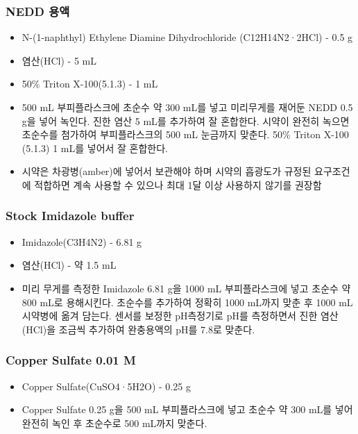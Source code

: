 \documentclass[
]{book}
\providecommand{\tightlist}{%
  \setlength{\itemsep}{0pt}\setlength{\parskip}{0pt}}
\begin{document}
\hypertarget{nedd-uxc6a9uxc561}{%
\subsubsection{NEDD 용액}\label{nedd-uxc6a9uxc561}}

\begin{itemize}
\tightlist
\item
  N-(1-naphthyl) Ethylene Diamine Dihydrochloride (C12H14N2·2HCl) - 0.5 g
\item
  염산(HCl) - 5 mL
\item
  50\% Triton X-100(5.1.3) - 1 mL
\item
  500 mL 부피플라스크에 초순수 약 300 mL를 넣고 미리무게를 재어둔 NEDD 0.5 g을 넣어 녹인다. 진한 염산 5 mL를 추가하여 잘 혼합한다. 시약이 완전히 녹으면 초순수를 첨가하여 부피플라스크의 500 mL 눈금까지 맞춘다. 50\% Triton X-100 (5.1.3) 1 mL를 넣어서 잘 혼합한다.
\item
  시약은 차광병(amber)에 넣어서 보관해야 하며 시약의 흡광도가 규정된 요구조건에 적합하면 계속 사용할 수 있으나 최대 1달 이상 사용하지 않기를 권장함
\end{itemize}

\hypertarget{stock-imidazole-buffer}{%
\subsubsection{Stock Imidazole buffer}\label{stock-imidazole-buffer}}

\begin{itemize}
\tightlist
\item
  Imidazole(C3H4N2) - 6.81 g
\item
  염산(HCl) - 약 1.5 mL
\item
  미리 무게를 측정한 Imidazole 6.81 g을 1000 mL 부피플라스크에 넣고 초순수 약 800 mL로 용해시킨다. 초순수를 추가하여 정확히 1000 mL까지 맞춘 후 1000 mL 시약병에 옮겨 담는다. 센서를 보정한 pH측정기로 pH를 측정하면서 진한 염산(HCl)을 조금씩 추가하여 완충용액의 pH를 7.8로 맞춘다.
\end{itemize}

\hypertarget{copper-sulfate-0.01-m}{%
\subsubsection{Copper Sulfate 0.01 M}\label{copper-sulfate-0.01-m}}

\begin{itemize}
\tightlist
\item
  Copper Sulfate(CuSO4·5H2O) - 0.25 g
\item
  Copper Sulfate 0.25 g을 500 mL 부피플라스크에 넣고 초순수 약 300 mL를 넣어 완전히 녹인 후 초순수로 500 mL까지 맞춘다.
\end{itemize}
\end{document}
